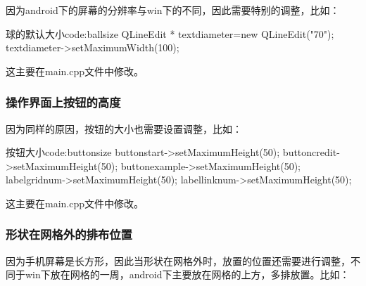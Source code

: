 \documentclass[11pt,twoside]{article} %
\begin{document}
因为android下的屏幕的分辨率与win下的不同，因此需要特别的调整，比如：

\begin{codecpp}{球的默认大小}{code:ballsize}
QLineEdit * textdiameter=new QLineEdit("70");
    textdiameter->setMaximumWidth(100);
\end{codecpp}

这主要在main.cpp文件中修改。

\subsubsection{操作界面上按钮的高度}

因为同样的原因，按钮的大小也需要设置调整，比如：
\begin{codecpp}{按钮大小}{code:buttonsize}
buttonstart->setMaximumHeight(50);
    buttoncredit->setMaximumHeight(50);
    buttonexample->setMaximumHeight(50);
    labelgridnum->setMaximumHeight(50);
    labellinknum->setMaximumHeight(50);
\end{codecpp}

这主要在main.cpp文件中修改。

\subsubsection{形状在网格外的排布位置}

因为手机屏幕是长方形，因此当形状在网格外时，放置的位置还需要进行调整，不同于win下放在网格的一周，android下主要放在网格的上方，多排放置。比如：
\end{document}
